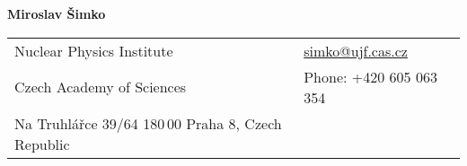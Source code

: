 \documentclass[letterpaper,11pt,oneside]{article}
\begin{document}

\noindent  \LARGE{\textbf{Miroslav Šimko}}  \\
\vspace{-2ex}
\normalsize


\begin{center}
\begin{tabular}{l l}
 Nuclear Physics Institute   & \hspace{1in} \href{mailto:simko@ujf.cas.cz}{simko@ujf.cas.cz} \\
 Czech Academy of Sciences    & \hspace{1in} Phone: +420 605 063 354 \\
 Na Truhlářce 39/64            
 180$\,$00 Praha 8, Czech Republic 
\end{tabular}
\end{center}

\vspace{1em}

\end{document}
